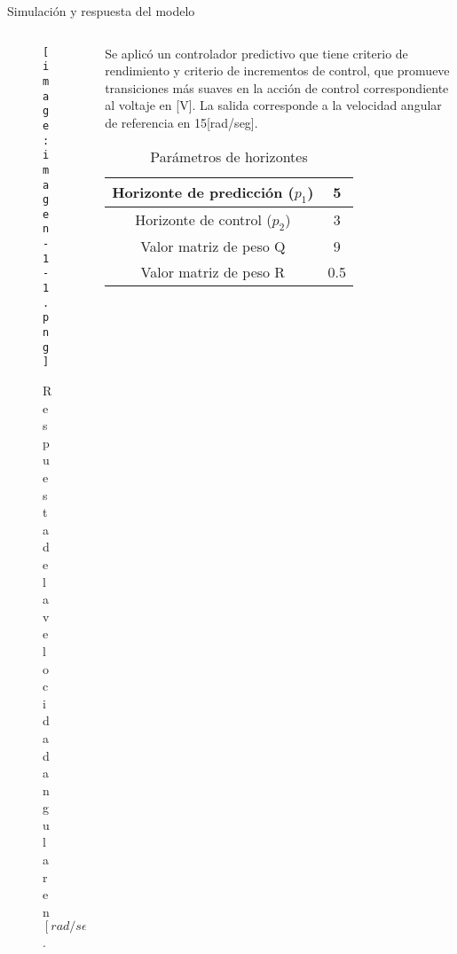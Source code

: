 \documentclass{beamer}
\begin{document}
\begin{frame}{Simulación y respuesta del modelo}
    \begin{columns}
        \begin{column}{0.45\textwidth}
            \begin{figure}
                \centering
                \texttt{[image: imagen-1-1.png]}
                \captionsetup{font=scriptsize}
                \caption{Respuesta de la velocidad angular en $[rad/seg]$.}
                \label{fig:practico-1}
            \end{figure}
        \end{column}
        
        \begin{column}{0.55\textwidth} %
            \scriptsize %
            Se aplicó un controlador predictivo que tiene criterio de rendimiento y criterio de incrementos de control, que promueve transiciones más suaves en la acción de control correspondiente al voltaje en [V]. La salida corresponde a la velocidad angular de referencia en 15[rad/seg].
            
            \begin{table}
                \caption{Parámetros de horizontes}
                \begin{tabular}{|c|c|}
                    \hline
                    Horizonte de predicción ($p_1$) & 5  \\
                    \hline
                    Horizonte de control ($p_2$) & 3  \\
                    \hline
                    Valor matriz de peso Q & 9  \\
                    \hline
                    Valor matriz de peso R & 0.5 \\
                    \hline
                \end{tabular}
            \end{table}
        \end{column}
    \end{columns}
\end{frame}
\end{document}
